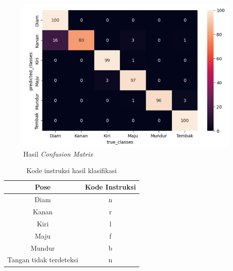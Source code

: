 \begin{figure}[H]
  \centering
  \includegraphics[width=0.8\linewidth]{../Gambar/confusionmatrix.png}
  \caption{Hasil \emph{Confusion Matrix}}
  \label{fig:confusionmatrix}
\end{figure}

\begin{table}[H]
  \centering
  \caption{Kode instruksi hasil klasifikasi}
  \label{tab:kodeinstruksi}
  \begin{tabular}{|c|c|}
  \hline
  Pose   & Kode Instruksi \\ \hline
  Diam   & n              \\ \hline
  Kanan  & r              \\ \hline
  Kiri   & l              \\ \hline
  Maju   & f              \\ \hline
  Mundur & b              \\ \hline
  Tangan tidak terdeteksi & n              \\ \hline
  \end{tabular}
\end{table}

